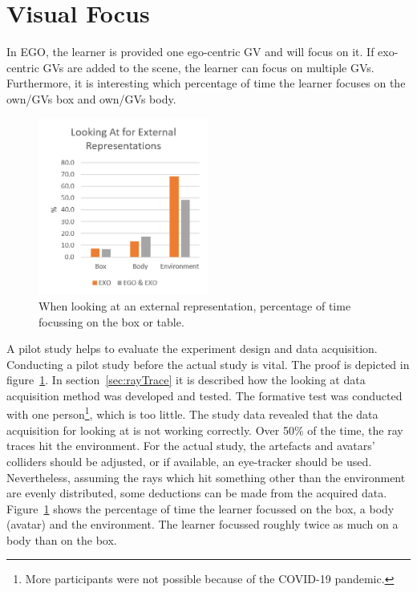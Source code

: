 \section{Visual Focus}
In EGO, the learner is provided one ego-centric GV and will focus on it. If exo-centric GVs are added to the scene, the learner can focus on multiple GVs. Furthermore, it is interesting which percentage of time the learner focuses on the own/GVs box and own/GVs body.\\
\begin{figure}[htb]
	\centering
	\includegraphics[width=0.5\textwidth]{figures/lookingAtExternalRepresentations.png}
	\caption[Looking At for external representations.]{When looking at an external representation, percentage of time focussing on the box or table.}
	\label{fig:lookingAtExternal}
\end{figure}
A pilot study helps to evaluate the experiment design and data acquisition. Conducting a pilot study before the actual study is vital. The proof is depicted in figure~\ref{fig:lookingAtExternal}. In section~\ref{sec:rayTrace} it is described how the looking at data acquisition method was developed and tested. The formative test was conducted with one person\footnote{More participants were not possible because of the COVID-19 pandemic.}, which is too little. The study data revealed that the data acquisition for looking at is not working correctly. Over 50\% of the time, the ray traces hit the environment. For the actual study, the artefacts and avatars' colliders should be adjusted, or if available, an eye-tracker should be used. Nevertheless, assuming the rays which hit something other than the environment are evenly distributed, some deductions can be made from the acquired data.\\
Figure~\ref{fig:lookingAtExternal} shows the percentage of time the learner focussed on the box, a body (avatar) and the environment. The learner focussed roughly twice as much on a body than on the box.\\
